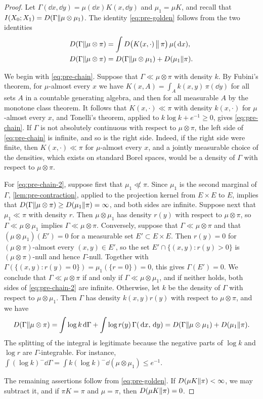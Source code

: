 \begin{proof}
Let $\Gamma(\dd x,\dd y)=\mu(\dd x)K(x,\dd y)$ and $\mu_1=\mu K$, and recall that $I(X_0;X_1)=D(\Gamma\|\mu\otimes\mu_1)$. The identity \eqref{eq:pre-golden} follows from the two identities
\begin{align}
D(\Gamma\|\mu\otimes\pi)&=\int D\big(K(x,\cdot)\,\big\|\,\pi\big)\,\mu(\,\mathrm d x),\label{eq:pre-chain}\\
D(\Gamma\|\mu\otimes\pi)&=D(\Gamma\|\mu\otimes\mu_1)+D(\mu_1\|\pi).\label{eq:pre-chain-2}
\end{align}

We begin with \eqref{eq:pre-chain}. Suppose that $\Gamma\ll\mu\otimes\pi$ with density $k$. By Fubini's theorem, for $\mu$-almost every $x$ we have $K(x,A)=\int_Ak(x,y)\,\pi(\dd y)$ for all sets $A$ in a countable generating algebra, and then for all measurable $A$ by the monotone class theorem. It follows that $K(x,\cdot)\ll\pi$ with density $k(x,\cdot)$ for $\mu$-almost every $x$, and Tonelli's theorem, applied to $k\log k+e^{-1}\ge0$, gives \eqref{eq:pre-chain}. If $\Gamma$ is not absolutely continuous with respect to $\mu\otimes\pi$, the left side of \eqref{eq:pre-chain} is infinite, and so is the right side. Indeed, if the right side were finite, then $K(x,\cdot)\ll\pi$ for $\mu$-almost every $x$, and a jointly measurable choice of the densities, which exists on standard Borel spaces, would be a density of $\Gamma$ with respect to $\mu\otimes\pi$.

For \eqref{eq:pre-chain-2}, suppose first that $\mu_1\not\ll\pi$. Since $\mu_1$ is the second marginal of $\Gamma$, \cref{lem:pre-contraction}, applied to the projection kernel from $E\times E$ to $E$, implies that $D(\Gamma\|\mu\otimes\pi)\ge D(\mu_1\|\pi)=\infty$, and both sides are infinite. Suppose next that $\mu_1\ll\pi$ with density $r$. Then $\mu\otimes\mu_1$ has density $r(y)$ with respect to $\mu\otimes\pi$, so $\Gamma\ll\mu\otimes\mu_1$ implies $\Gamma\ll\mu\otimes\pi$. Conversely, suppose that $\Gamma\ll\mu\otimes\pi$ and that $(\mu\otimes\mu_1)(E')=0$ for a measurable set $E'\subset E\times E$. Then $r(y)=0$ for $(\mu\otimes\pi)$-almost every $(x,y)\in E'$, so the set $E'\cap\{(x,y):r(y)>0\}$ is $(\mu\otimes\pi)$-null and hence $\Gamma$-null. Together with $\Gamma(\{(x,y):r(y)=0\})=\mu_1(\{r=0\})=0$, this gives $\Gamma(E')=0$. We conclude that $\Gamma\ll\mu\otimes\pi$ if and only if $\Gamma\ll\mu\otimes\mu_1$, and if neither holds, both sides of \eqref{eq:pre-chain-2} are infinite. Otherwise, let $k$ be the density of $\Gamma$ with respect to $\mu\otimes\mu_1$. Then $\Gamma$ has density $k(x,y)r(y)$ with respect to $\mu\otimes\pi$, and we have
\[
D(\Gamma\|\mu\otimes\pi)=\int\log k\,\mathrm d \Gamma+\int\log r(y)\,\Gamma(\,\mathrm d x,\,\mathrm d y)=D(\Gamma\|\mu\otimes\mu_1)+D(\mu_1\|\pi).
\]
The splitting of the integral is legitimate because the negative parts of $\log k$ and $\log r$ are $\Gamma$-integrable. For instance, $\int(\log k)^-\dd \Gamma=\int k(\log k)^-\dd(\mu\otimes\mu_1)\le e^{-1}$.

The remaining assertions follow from \eqref{eq:pre-golden}. If $D(\mu K\|\pi)<\infty$, we may subtract it, and if $\pi K=\pi$ and $\mu=\pi$, then $D(\mu K\|\pi)=0$.
\end{proof}

